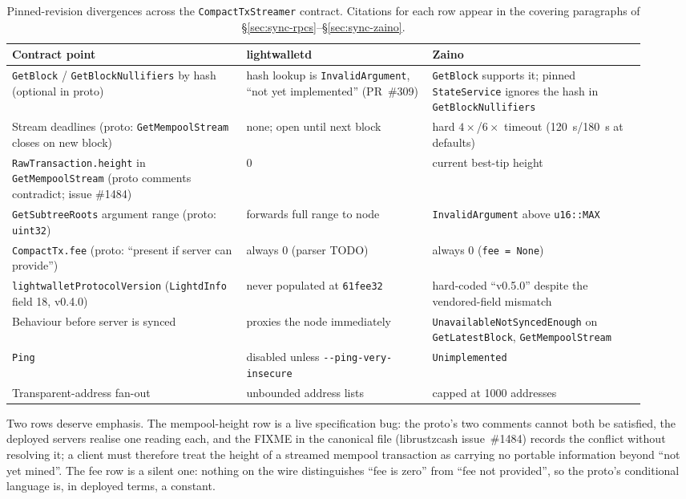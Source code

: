 \documentclass[11pt,a4paper]{article}
\theoremstyle{definition}
\begin{document}
\begin{table}[htbp]
\centering
\small
\begin{tabular}{@{}p{0.34\linewidth}p{0.27\linewidth}p{0.31\linewidth}@{}}
\toprule
Contract point & lightwalletd & Zaino \\
\midrule
\texttt{GetBlock} / \texttt{GetBlockNullifiers} by hash (optional in proto) &
hash lookup is \texttt{InvalidArgument}, ``not yet implemented''
(PR~\#309) &
\texttt{GetBlock} supports it; pinned \texttt{StateService} ignores the
hash in \texttt{GetBlockNullifiers} \\
\addlinespace
Stream deadlines (proto: \texttt{GetMempoolStream} closes on new block) &
none; open until next block &
hard $4\times$/$6\times$ timeout (120~s/180~s at defaults) \\
\addlinespace
\texttt{RawTransaction.height} in \texttt{GetMempoolStream} (proto
comments contradict; issue \#1484) &
$0$ &
current best-tip height \\
\addlinespace
\texttt{GetSubtreeRoots} argument range (proto: \texttt{uint32}) &
forwards full range to node &
\texttt{InvalidArgument} above \texttt{u16::MAX} \\
\addlinespace
\texttt{CompactTx.fee} (proto: ``present if server can provide'') &
always 0 (parser TODO) &
always 0 (\texttt{fee = None}) \\
\addlinespace
\texttt{lightwalletProtocolVersion} (\texttt{LightdInfo} field 18,
v0.4.0) &
never populated at \texttt{61fee32} &
hard-coded ``v0.5.0'' despite the vendored-field mismatch \\
\addlinespace
Behaviour before server is synced &
proxies the node immediately &
\texttt{UnavailableNotSyncedEnough} on \texttt{GetLatestBlock},
\texttt{GetMempoolStream} \\
\addlinespace
\texttt{Ping} &
disabled unless \texttt{-{}-ping-very-insecure} &
\texttt{Unimplemented} \\
\addlinespace
Transparent-address fan-out &
unbounded address lists &
capped at 1000 addresses \\
\bottomrule
\end{tabular}
\caption{Pinned-revision divergences across the
\texttt{CompactTxStreamer} contract. Citations for each row appear in the
covering paragraphs of \S\ref{sec:sync-rpcs}--\S\ref{sec:sync-zaino}.}
\label{tab:sync-divergences}
\end{table}

Two rows deserve emphasis. The mempool-height row is a live
specification bug: the proto's two comments cannot both be satisfied,
the deployed servers realise one reading each, and the FIXME in the
canonical file (librustzcash issue~\#1484) records the conflict without
resolving it; a client must therefore treat the height of a streamed
mempool transaction as carrying no portable information beyond ``not yet
mined''. The fee row is a silent one: nothing on the wire distinguishes
``fee is zero'' from ``fee not provided'', so the proto's conditional
language is, in deployed terms, a constant.
\end{document}
